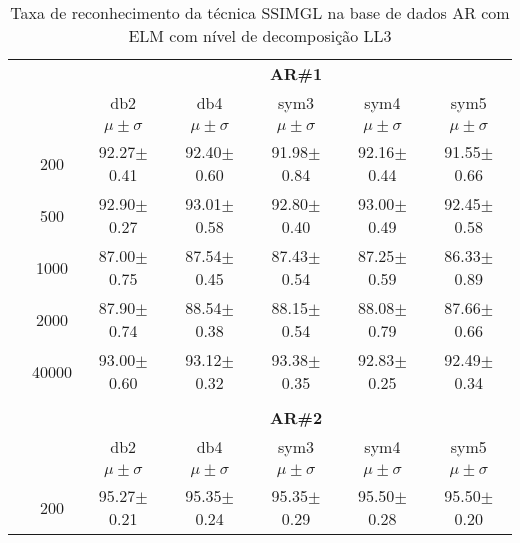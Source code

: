 \begin{table}[H]
	\centering
    \normalsize
	\caption{Taxa de reconhecimento da técnica SSIMGL na base de dados AR com ELM com nível de decomposição LL3}
		\begin{tabular}{|c|c|c c c c c|}
\cline{3-7}
\multicolumn{2}{c|}{\multirow{3}{*}{}} & \multicolumn{5}{c|}{\textbf{AR\#1}}   \\\cline{3-7} 
\multicolumn{2}{c|}{}  & db2 & db4 & sym3 & sym4 & sym5 \\\cline{3-7}%
\multicolumn{2}{c|}{}& $\mu \pm \sigma$ & $\mu \pm \sigma$ & $\mu \pm \sigma$ & $\mu \pm \sigma$ & $\mu \pm \sigma$ \\\hline


\multicolumn{1}{|c|}{ \multirow{5}{*}{\rotatebox[origin=c]{90}{\textbf{Neurônios}}} }
&200&92.27$\pm$0.41		&92.40$\pm$0.60	&91.98$\pm$0.84	&92.16$\pm$0.44	&91.55$\pm$0.66         \\\cline{2-7}

&500&92.90$\pm$0.27		&93.01$\pm$0.58	&92.80$\pm$0.40	& 93.00$\pm$0.49	&92.45$\pm$0.58   \\\cline{2-7}
           
&1000&87.00$\pm$0.75	&87.54$\pm$0.45	&87.43$\pm$0.54	&87.25$\pm$0.59	&86.33$\pm$0.89   \\\cline{2-7}
           
&2000&87.90$\pm$0.74	&88.54$\pm$0.38	&88.15$\pm$0.54	&88.08$\pm$0.79&87.66$\pm$0.66  \\\cline{2-7}
          
&40000&93.00$\pm$0.60	& 93.12$\pm$0.32	&93.38$\pm$0.35	&92.83$\pm$0.25	& 92.49$\pm$0.34     \\ \midrule
\multicolumn{7}{c}{}\\ 


\cline{3-7}
\multicolumn{2}{c|}{\multirow{3}{*}{}} & \multicolumn{5}{c|}{\textbf{AR\#2}}   \\\cline{3-7} 
\multicolumn{2}{c|}{}  & db2 & db4 & sym3 & sym4 & sym5 \\\cline{3-7}%
\multicolumn{2}{c|}{}& $\mu \pm \sigma$ & $\mu \pm \sigma$ & $\mu \pm \sigma$ & $\mu \pm \sigma$ & $\mu \pm \sigma$ \\\hline

\multicolumn{1}{|c|}{ \multirow{5}{*}{\rotatebox[origin=c]{90}{\textbf{Neurônios}}} }
&200 &95.27$\pm$0.21&95.35$\pm$0.24	&95.35$\pm$0.29	&95.50$\pm$0.28	& 95.50$\pm$0.20 \\\cline{2-7}


\end{tabular}
\end{table}

